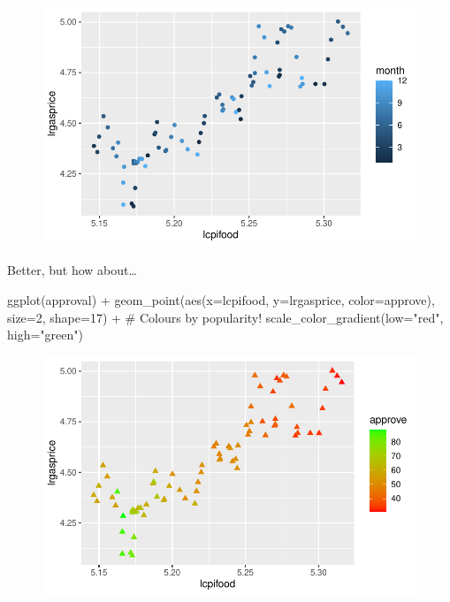 \documentclass[
  letterpaper,
]{book}
\newenvironment{Shaded}{\begin{snugshade}}{\end{snugshade}}
\newcommand{\AttributeTok}[1]{\textcolor[rgb]{0.40,0.45,0.13}{#1}}
\newcommand{\CommentTok}[1]{\textcolor[rgb]{0.37,0.37,0.37}{#1}}
\newcommand{\DecValTok}[1]{\textcolor[rgb]{0.68,0.00,0.00}{#1}}
\newcommand{\FunctionTok}[1]{\textcolor[rgb]{0.28,0.35,0.67}{#1}}
\newcommand{\NormalTok}[1]{\textcolor[rgb]{0.00,0.23,0.31}{#1}}
\newcommand{\SpecialCharTok}[1]{\textcolor[rgb]{0.37,0.37,0.37}{#1}}
\newcommand{\StringTok}[1]{\textcolor[rgb]{0.13,0.47,0.30}{#1}}
\begin{document}
\begin{figure}[H]

{\centering \includegraphics{Appendix1_files/figure-pdf/p2-1.pdf}

}

\end{figure}

Better, but how about\ldots{}

\begin{Shaded}
\begin{Highlighting}[]
\FunctionTok{ggplot}\NormalTok{(approval) }\SpecialCharTok{+}
  \FunctionTok{geom\_point}\NormalTok{(}\FunctionTok{aes}\NormalTok{(}\AttributeTok{x=}\NormalTok{lcpifood, }\AttributeTok{y=}\NormalTok{lrgasprice, }\AttributeTok{color=}\NormalTok{approve), }\AttributeTok{size=}\DecValTok{2}\NormalTok{, }\AttributeTok{shape=}\DecValTok{17}\NormalTok{) }\SpecialCharTok{+} \CommentTok{\# Colours by popularity!}
  \FunctionTok{scale\_color\_gradient}\NormalTok{(}\AttributeTok{low=}\StringTok{"red"}\NormalTok{, }\AttributeTok{high=}\StringTok{"green"}\NormalTok{) }
\end{Highlighting}
\end{Shaded}

\begin{figure}[H]

{\centering \includegraphics{Appendix1_files/figure-pdf/p2a-1.pdf}

}

\end{figure}
\end{document}
